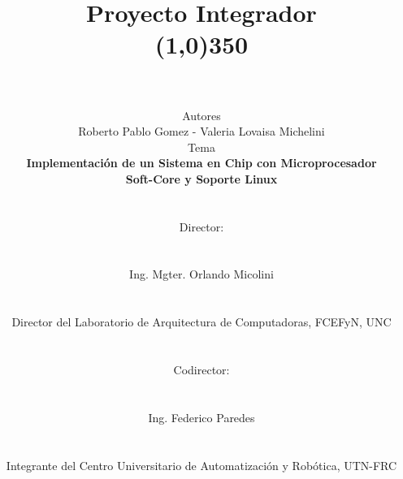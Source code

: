 \documentclass[a4paper,12pt]{report}
\begin{document}
\setlength{\parindent}{12pt}
\setlength{\parskip}{3mm}

\title{\vspace{-4cm} \textbf{Proyecto Integrador \\ \line(1,0){350}}\\
  \vspace{0.5cm}\\}
\author{\vspace{-0.25cm} Autores \vspace{0.25cm}\\ Roberto Pablo Gomez - Valeria Lovaisa Michelini \bigskip \bigskip \bigskip \\
  Tema \vspace{0.25cm} \\ \textbf{Implementación de un Sistema en Chip con Microprocesador  }\\ \textbf{ Soft-Core y Soporte Linux} \\ \textbf{}
  \bigskip \bigskip \bigskip \bigskip\\
  \begin{normalsize}Director:\end{normalsize}\\
  \begin{normalsize}Ing. Mgter. Orlando  Micolini \end{normalsize} \\
  \begin{normalsize}Director del Laboratorio de Arquitectura de Computadoras, FCEFyN, UNC\bigskip \bigskip \end{normalsize} \\
  \begin{normalsize}Codirector:\end{normalsize} \\
  \begin{normalsize}Ing. Federico Paredes \end{normalsize}\\ 
  \begin{normalsize}Integrante del Centro Universitario de Automatización y Robótica, UTN-FRC\bigskip \bigskip \end{normalsize}\\
  }
\date{}
\end{document}

